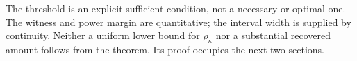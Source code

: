 The threshold is an explicit sufficient condition, not a necessary or optimal one. The witness and power margin are quantitative; the interval width is supplied by continuity. Neither a uniform lower bound for $\rho_\kappa$ nor a substantial recovered amount follows from the theorem. Its proof occupies the next two sections.
